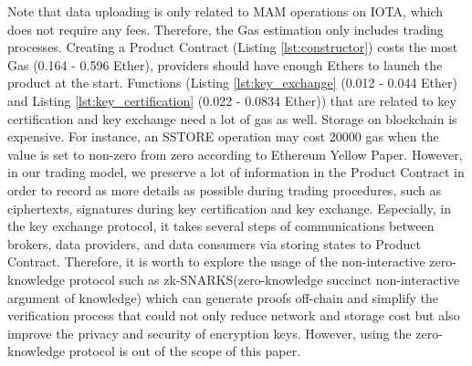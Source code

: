 \begin{spacing}{2.0}
\begin{table}[h]
	\caption{Gas consumption for each function of Product Contract}
	\label{tab:gas}
	\centering
\end{table}

Note that data uploading is only related to MAM operations on IOTA, which does not require any fees. Therefore, the Gas estimation only includes trading processes. Creating a Product Contract (Listing \ref{lst:constructor}) costs the most Gas (0.164 - 0.596 Ether), providers should have enough Ethers to launch the product at the start. Functions (Listing \ref{lst:key_exchange} (0.012 - 0.044 Ether) and Listing \ref{lst:key_certification} (0.022 - 0.0834 Ether)) that are related to key certification and key exchange need a lot of gas as well. Storage on blockchain is expensive. For instance, an SSTORE operation may cost 20000 gas when the value is set to non-zero from zero according to Ethereum Yellow Paper\cite{Ethereum}. However, in our trading model, we preserve a lot of information in the Product Contract in order to record as more details as possible during trading procedures, such as ciphertexts,  signatures during key certification and key exchange. Especially, in the key exchange protocol, it takes several steps of communications between brokers, data providers, and data consumers via storing states to Product Contract. Therefore, it is worth to explore the usage of the non-interactive zero-knowledge protocol such as zk-SNARKS(zero-knowledge succinct non-interactive argument of knowledge)\cite{Snark} which can generate proofs off-chain and simplify the verification process that could not only reduce network and storage cost but also improve the privacy and security of encryption keys. However, using the zero-knowledge protocol is out of the scope of this paper.


\end{spacing}
